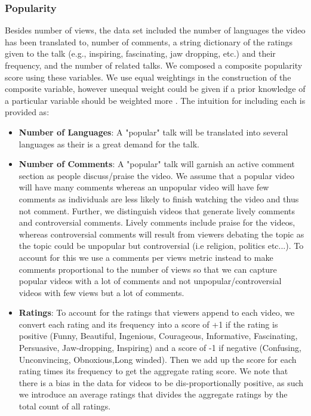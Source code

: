 \subsubsection{Popularity}
Besides number of views, the data set included the number of languages the video has been translated to, number of comments, a string dictionary of the ratings given to the talk (e.g., inspiring, fascinating, jaw dropping, etc.) and their frequency, and the number of related talks. We composed a composite popularity score using these variables. We use equal weightings in the construction of the composite variable, however unequal weight could be given if a prior knowledge of a particular variable should be weighted more \cite{song2013composite}. The intuition for including each is provided as:
\begin{itemize}
	\item \textbf{Number of Languages}: A "popular" talk will be translated into several languages as their is a great demand for the talk.
	\item \textbf{Number of Comments}: A "popular" talk will garnish an active comment section as people discuss/praise the video. We assume that a popular video will have many comments whereas an unpopular video will have few comments as individuals are less likely to finish watching the video and thus not comment. Further, we distinguish videos that generate lively comments and controversial comments. Lively comments include praise for the videos, whereas controversial comments will result from viewers debating the topic as the topic could be unpopular but controversial (i.e religion, politics etc...). To account for this we use a comments per views metric instead to make comments proportional to the number of views so that we can capture popular videos with a lot of comments and not unpopular/controversial videos with few views but a lot of comments. 
	\item \textbf{Ratings}: To account for the ratings that viewers append to each video, we convert each rating and its frequency into a score of +1 if the rating is positive (Funny, Beautiful, Ingenious, Courageous, Informative, 
	Fascinating, Persuasive,
	Jaw-dropping, Inspiring) and a score of -1 if negative (Confusing, Unconvincing, Obnoxious,Long winded). Then we add up the score for each rating times its frequency to get the aggregate rating score. We note that there is a bias in the data for videos to be dis-proportionally positive, as such we introduce an average ratings that divides the aggregate ratings by the total count of all ratings. 

\end{itemize}
